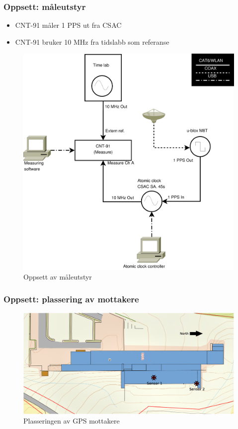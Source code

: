 \documentclass[xcolor=table]{beamer}
\begin{document}
\begin{frame}
\frametitle{Oppsett: måleutstyr}
  \begin{itemize}
    \item CNT-91 måler 1 PPS ut fra CSAC
    \item CNT-91 bruker 10 MHz fra tidslabb som referanse
  \end{itemize}
      \begin{figure}
        \includegraphics[scale=0.25]{thesis/graphics/measure_setup.pdf}
        \caption{Oppsett av måleutstyr}
      \end{figure}
\end{frame}

\begin{frame}
\frametitle{Oppsett: plassering av mottakere}
      \begin{figure}
        \includegraphics[scale=0.18]{thesis/graphics/roof.eps}
        \caption{Plasseringen av GPS mottakere}
      \end{figure}
\end{frame}
\end{document}
